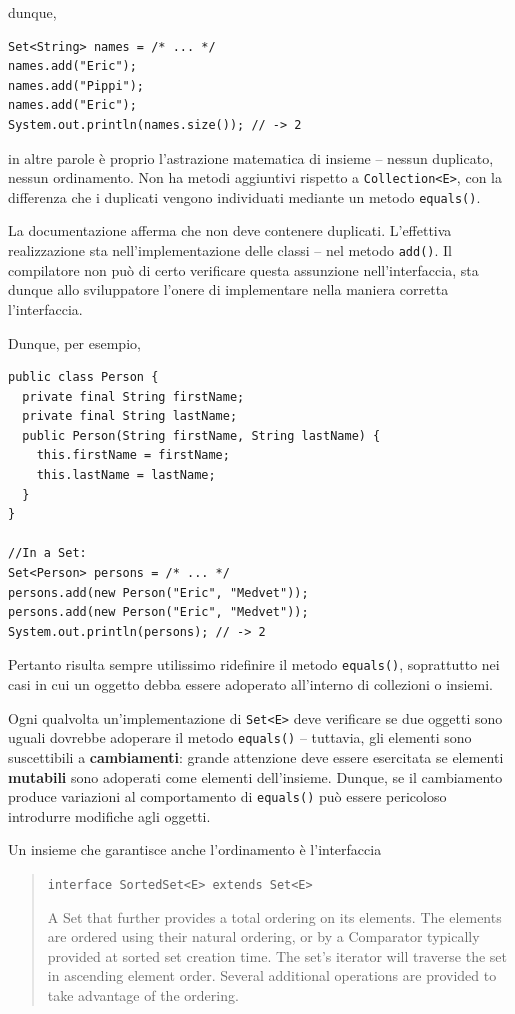 \documentclass[\fontsizeclass,twocolumn]{\classname}
\theoremstyle{definition}
\theoremstyle{definition}
\begin{document}
dunque,

\begin{lstlisting}
Set<String> names = /* ... */
names.add("Eric");
names.add("Pippi");
names.add("Eric");
System.out.println(names.size()); // -> 2
\end{lstlisting}

in altre parole è proprio l'astrazione matematica di insieme -- nessun
duplicato, nessun ordinamento. Non ha metodi aggiuntivi rispetto a
\texttt{Collection<E>}, con la differenza che i duplicati vengono individuati
mediante un metodo \texttt{equals()}.

La documentazione afferma che non deve contenere duplicati. L'effettiva
realizzazione sta nell'implementazione delle classi -- nel metodo
\texttt{add()}. Il compilatore non può di certo verificare questa assunzione
nell'interfaccia, sta dunque allo sviluppatore l'onere di implementare nella
maniera corretta l'interfaccia.

Dunque, per esempio,

\begin{lstlisting}
public class Person {
  private final String firstName;
  private final String lastName;
  public Person(String firstName, String lastName) {
    this.firstName = firstName;
    this.lastName = lastName;
  }
}

//In a Set:
Set<Person> persons = /* ... */
persons.add(new Person("Eric", "Medvet"));
persons.add(new Person("Eric", "Medvet"));
System.out.println(persons); // -> 2
\end{lstlisting}

Pertanto risulta sempre utilissimo ridefinire il metodo \texttt{equals()},
soprattutto nei casi in cui un oggetto debba essere adoperato all'interno di
collezioni o insiemi.

Ogni qualvolta un'implementazione di \texttt{Set<E>} deve verificare se due
oggetti sono uguali dovrebbe adoperare il metodo \texttt{equals()} -- tuttavia,
gli elementi sono suscettibili a \textbf{cambiamenti}: grande attenzione deve
essere esercitata se elementi \textbf{mutabili} sono adoperati come elementi
dell'insieme. Dunque, se il cambiamento produce variazioni al comportamento di
\texttt{equals()} può essere pericoloso introdurre modifiche agli oggetti.

Un insieme che garantisce anche l'ordinamento è l'interfaccia
\begin{quote}
    \footnotesize{\texttt{interface SortedSet<E> extends Set<E>}

A Set that further provides a total ordering on its elements. The elements are ordered using their natural ordering, or by a Comparator typically provided at sorted set creation time. The set's iterator will traverse the set in ascending element order. Several additional operations are provided to take advantage of the ordering.
}
\end{quote}
\end{document}
